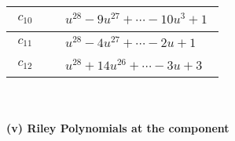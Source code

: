 \documentclass[1p]{elsarticle_modified}
\theoremstyle{definition}
\begin{document}
\begin{tabular}{m{50pt}|m{274pt}}
\hline $$\begin{aligned}c_{10}\end{aligned}$$&$\begin{aligned}
&u^{28}-9 u^{27}+\cdots-10 u^3+1
\end{aligned}$\\
\hline $$\begin{aligned}c_{11}\end{aligned}$$&$\begin{aligned}
&u^{28}-4 u^{27}+\cdots-2 u+1
\end{aligned}$\\
\hline $$\begin{aligned}c_{12}\end{aligned}$$&$\begin{aligned}
&u^{28}+14 u^{26}+\cdots-3 u+3
\end{aligned}$\\
\hline
\end{tabular}\\~\\
\newpage\renewcommand{\arraystretch}{1}
\flushleft \textbf{(v) Riley Polynomials at the component}\newline \\
\end{document}
